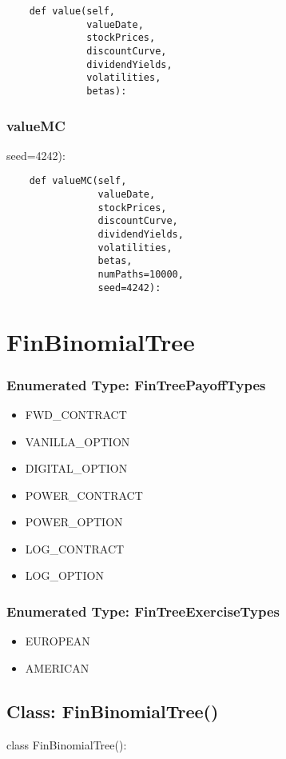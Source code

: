 \documentclass[twoside,11pt]{book}
\begin{document}
\begin{lstlisting}
    def value(self,
              valueDate,
              stockPrices,
              discountCurve,
              dividendYields,
              volatilities,
              betas):
\end{lstlisting}

\subsubsection*{{\bf valueMC}}
seed=4242): 

\begin{lstlisting}
    def valueMC(self,
                valueDate,
                stockPrices,
                discountCurve,
                dividendYields,
                volatilities,
                betas,
                numPaths=10000,
                seed=4242):
\end{lstlisting}

\newpage
\section{FinBinomialTree}

\subsubsection{Enumerated Type: FinTreePayoffTypes}
\begin{itemize}
\item{FWD\_CONTRACT}
\item{VANILLA\_OPTION}
\item{DIGITAL\_OPTION}
\item{POWER\_CONTRACT}
\item{POWER\_OPTION}
\item{LOG\_CONTRACT}
\item{LOG\_OPTION}
\end{itemize}

\subsubsection{Enumerated Type: FinTreeExerciseTypes}
\begin{itemize}
\item{EUROPEAN}
\item{AMERICAN}
\end{itemize}

\subsection*{Class: FinBinomialTree()}
class FinBinomialTree(): 
\end{document}
